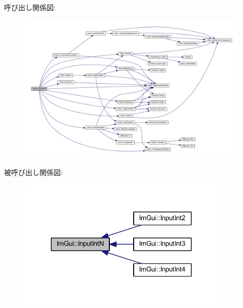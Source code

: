 呼び出し関係図\+:\nopagebreak
\begin{figure}[H]
\begin{center}
\leavevmode
\includegraphics[width=350pt]{namespace_im_gui_a9b9aaec8d095156b74ee191b532fa137_cgraph}
\end{center}
\end{figure}
被呼び出し関係図\+:\nopagebreak
\begin{figure}[H]
\begin{center}
\leavevmode
\includegraphics[width=287pt]{namespace_im_gui_a9b9aaec8d095156b74ee191b532fa137_icgraph}
\end{center}
\end{figure}
\mbox{\label{namespace_im_gui_a9b7223f54687d740a5961d7f278e01ef}} 
